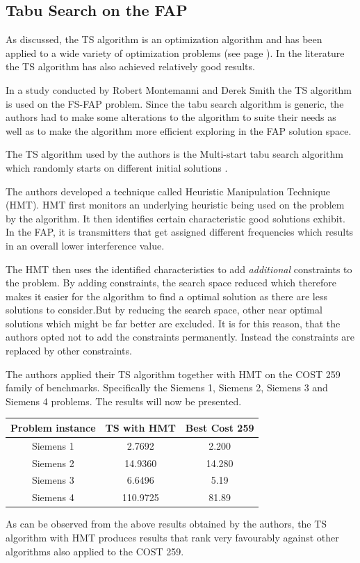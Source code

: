 \subsection{Tabu Search on the FAP}
As discussed, the TS algorithm is an optimization algorithm and has been applied to a wide variety of optimization problems (see page \pageref{sec:TSIntroduction}). In the literature the TS algorithm has also achieved relatively good results.

In a study conducted by Robert Montemanni and Derek Smith \cite{TabuMontemanniSmith} the TS algorithm is used on the FS-FAP problem. Since the tabu search algorithm is generic, the authors had to make some alterations to the algorithm to suite their needs as well as to make the algorithm more efficient exploring in the FAP solution space.

The TS algorithm used by the authors is the Multi-start tabu search algorithm which randomly starts on different initial solutions \cite{TabuMontemanniSmith}.

The authors developed a technique called Heuristic Manipulation Technique (HMT). HMT first monitors an underlying heuristic being used on the problem by the algorithm\cite{TabuMontemanniSmith}. It then identifies certain characteristic good solutions exhibit. In the FAP, it is transmitters that get assigned different frequencies which results in an overall lower interference value\cite{TabuMontemanniSmith}.

The HMT then uses the identified characteristics to add \emph{additional} constraints to the problem\cite{TabuMontemanniSmith}. By adding constraints, the search space reduced which therefore makes it easier for the algorithm to find a optimal solution as there are less solutions to consider.But by reducing the search space, other near optimal solutions which might be far better are excluded\cite{TabuMontemanniSmith}. It is for this reason, that the authors opted not to add the constraints permanently. Instead the constraints are replaced by other constraints\cite{TabuMontemanniSmith}.

The authors applied their TS algorithm together with HMT on the COST 259 family of benchmarks. Specifically the Siemens 1, Siemens 2, Siemens 3 and Siemens 4 problems.  The results will now be presented.
\begin{table}
\centering
	\begin{tabular}{| c | c | c |}
		\hline
		Problem instance & TS with HMT & Best Cost 259 \\ \hline
		Siemens 1 & 2.7692 & 2.200 \\ \hline
		Siemens 2 & 14.9360 & 14.280 \\ \hline
		Siemens 3 & 6.6496 & 5.19 \\ \hline
		Siemens 4 & 110.9725 & 81.89 \\ \hline
	\end{tabular}
\end{table}
As can be observed from the above results obtained by the authors, the TS algorithm with HMT produces results that rank very favourably against other algorithms also applied to the COST 259.

